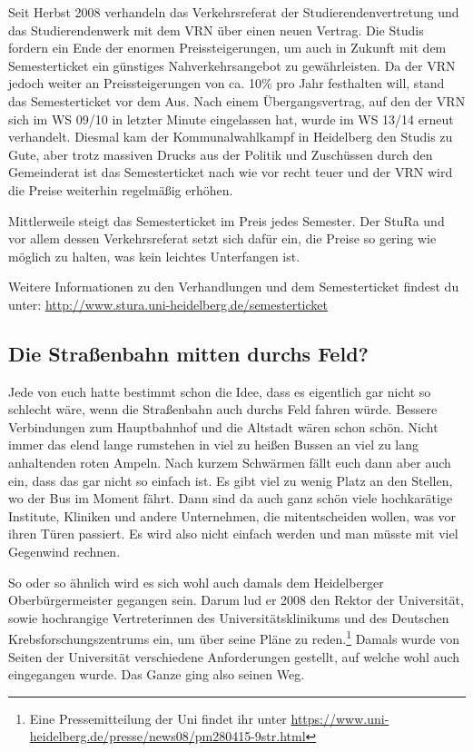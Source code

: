 Seit Herbst 2008 verhandeln das Verkehrsreferat der Studierendenvertretung und das Studierendenwerk mit dem VRN über einen neuen Vertrag. Die Studis fordern ein Ende der enormen Preissteigerungen, um auch in Zukunft mit dem Semesterticket ein günstiges Nahverkehrsangebot zu gewährleisten. Da der VRN jedoch weiter an Preissteigerungen von ca. 10\% pro Jahr festhalten will, stand das Semesterticket vor dem Aus. Nach einem Übergangsvertrag, auf den der VRN sich im WS 09/10 in letzter Minute eingelassen hat, wurde im WS 13/14 erneut verhandelt. Diesmal kam der Kommunalwahlkampf in Heidelberg den Studis zu Gute, aber trotz massiven Drucks aus der Politik und Zuschüssen durch den Gemeinderat ist das Semesterticket nach wie vor recht teuer und der VRN wird die Preise weiterhin regelmäßig erhöhen.

Mittlerweile steigt das Semesterticket im Preis jedes Semester. Der StuRa und vor allem dessen Verkehrsreferat setzt sich dafür ein, die Preise so gering wie möglich zu halten, was kein leichtes Unterfangen ist.

Weitere Informationen zu den Verhandlungen und dem Semesterticket findest du unter: \url{http://www.stura.uni-heidelberg.de/semesterticket}

\subsection{Die Straßenbahn mitten durchs Feld?}

Jede von euch hatte bestimmt schon die Idee, dass es eigentlich gar nicht so schlecht wäre, wenn die Straßenbahn auch durchs Feld fahren würde. Bessere Verbindungen zum Hauptbahnhof und die Altstadt wären schon schön. Nicht immer das elend lange rumstehen in viel zu heißen Bussen an viel zu lang anhaltenden roten Ampeln. Nach kurzem Schwärmen fällt euch dann aber auch ein, dass das gar nicht so einfach ist. Es gibt viel zu wenig Platz an den Stellen, wo der Bus im Moment fährt. Dann sind da auch ganz schön viele hochkarätige Institute, Kliniken und andere Unternehmen, die mitentscheiden wollen, was vor ihren Türen passiert. Es wird also nicht einfach werden und man müsste mit viel Gegenwind rechnen.

So oder so ähnlich wird es sich wohl auch damals dem Heidelberger Oberbürgermeister gegangen sein. Darum lud er 2008 den Rektor der Universität, sowie hochrangige Vertreterinnen des Universitätsklinikums und des Deutschen Krebsforschungszentrums ein, um über seine Pläne zu reden.\footnote{Eine Pressemitteilung der Uni findet ihr unter \url{https://www.uni-heidelberg.de/presse/news08/pm280415-9str.html}} Damals wurde von Seiten der Universität verschiedene Anforderungen gestellt, auf welche wohl auch eingegangen wurde. Das Ganze ging also seinen Weg.

